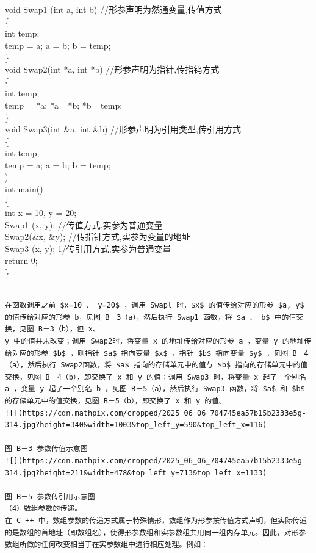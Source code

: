\documentclass[10pt]{article}
\begin{document}
void Swap1 (int a, int b) //形参声明为然通变量,传值方式\\
\{\\
int temp;\\
temp = a; a = b; b = temp;\\
\}\\
void Swap2(int *a, int *b) //形参声明为指针,传指钨方式\\
\{\\
int temp;\\
temp = *a; *a= *b; *b= temp;\\
\}\\
void Swap3(int \&a, int \&b) //形参声明为引用类型,传引用方式\\
\{\\
int temp;\\
temp = a; a = b; b = temp;\\
)\\
int main()\\
\{\\
int x = 10, y = 20;\\
Swap1 (x, y); //传值方式,实参为普通变量\\
Swap2(\&x, \&y); //传指针方式,实参为变量的地址\\
Swap3 (x, y); 1/传引用方式,实参为普通变量\\
return 0;\\
\}

\begin{verbatim}

在函数调用之前 $x=10 、 y=20$ ，调用 Swapl 时，$x$ 的值传给对应的形参 $a, y$ 的值传给对应的形参 b，见图 B－3（a），然后执行 Swap1 函数，将 $a 、 b$ 中的值交换，见图 B－3（b），但 x、
y 中的值并未改变；调用 Swap2时，将变量 x 的地址传给对应的形参 a ，变量 y 的地址传给对应的形参 $b$ ，则指针 $a$ 指向变量 $x$ ，指针 $b$ 指向变量 $y$ ，见图 B－4（a），然后执行 Swap2函数，将 $a$ 指向的存储单元中的值与 $b$ 指向的存储单元中的值交换，见图 B－4（b），即交换了 x 和 y 的值；调用 Swap3 时，将变量 x 起了一个别名 a ，变量 y 起了一个别名 b ，见图 B－5（a），然后执行 Swap3 函数，将 $a$ 和 $b$ 的存储单元中的值交换，见图 B－5（b），即交换了 x 和 y 的值。
![](https://cdn.mathpix.com/cropped/2025_06_06_704745ea57b15b2333e5g-314.jpg?height=340&width=1003&top_left_y=590&top_left_x=116)

图 B－3 参数传值示意图
![](https://cdn.mathpix.com/cropped/2025_06_06_704745ea57b15b2333e5g-314.jpg?height=211&width=478&top_left_y=713&top_left_x=1133)

图 B－5 参数传引用示意图
（4）数组参数的传递。
在 C ++ 中，数组参数的传递方式属于特殊情形，数组作为形参按传值方式声明，但实际传递的是数组的首地址（即数组名），使得形参数组和实参数组共用同一组内存单元。因此，对形参数组所做的任何改变相当于在实参数组中进行相应处理。例如：
\end{verbatim}
\end{document}
